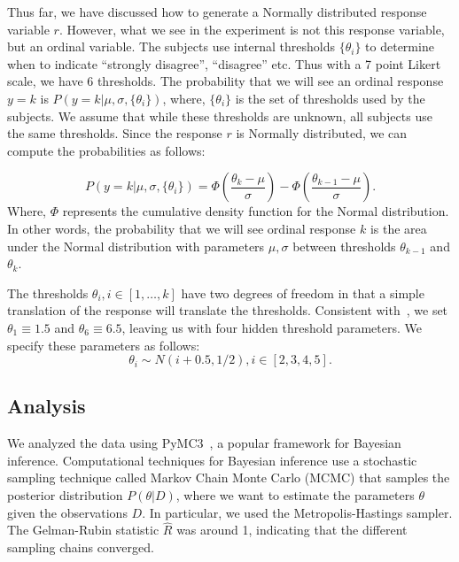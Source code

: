Thus far, we have discussed how to generate a Normally distributed response variable $r$. However, what we see in the experiment is not this response variable, but an ordinal variable. The subjects use internal thresholds $\{\theta_i\}$ to determine when to indicate ``strongly disagree'', ``disagree'' etc. Thus with a 7 point Likert scale, we have 6 thresholds. The probability that we will see an ordinal response $y=k$ is $P(y=k | \mu, \sigma, \{\theta_i\})$, where, $\{\theta_i\}$ is the set of thresholds used by the subjects. We assume that while these thresholds are unknown, all subjects use the same thresholds. Since the response $r$ is Normally distributed, we can compute the probabilities as follows:

\begin{equation}
 P(y=k | \mu, \sigma, \{\theta_i\}) = \Phi \left (\frac{\theta_k - \mu}{\sigma} \right) - \Phi \left(\frac{\theta_{k-1} - \mu}{\sigma} \right).
\end{equation}
Where, $\Phi$ represents the cumulative density function for the Normal distribution. In other words, the probability that we will see ordinal response $k$ is the area under the Normal distribution with parameters $\mu, \sigma$ between thresholds $\theta_{k-1}$ and $\theta_k$.

The thresholds $\theta_i, i \in [1, \ldots, k]$ have two degrees of freedom in that a simple translation of the response will translate the thresholds. Consistent with~\textcite[][p. 674]{Kruschke2014}, we set $\theta_1\equiv1.5$ and $\theta_6\equiv6.5$, leaving us with four hidden threshold parameters. We specify these parameters as follows:
\begin{equation}
 \theta_i \sim N(i+0.5, 1/2), i \in [2, 3, 4, 5].
\end{equation}

\subsection{Analysis}
\label{sub:Analysis}

We analyzed the data using PyMC3~\cite{Salvatier2016}, a popular framework for Bayesian inference. Computational techniques for Bayesian inference use a stochastic sampling technique called Markov Chain Monte Carlo (MCMC) that samples the posterior distribution $P(\theta | D)$, where we want to estimate the parameters $\theta$ given the observations $D$. In particular, we used the Metropolis-Hastings sampler. The Gelman-Rubin statistic $\hat{R}$ was around 1, indicating that the different sampling chains converged.

